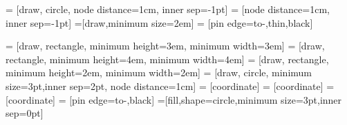  = [draw, circle, node distance=1cm,  inner sep=-1pt] %
 = [node distance=1cm,  inner sep=-1pt] %
=[draw,minimum size=2em]
 = [pin edge={to-,thin,black}]


 = [draw, rectangle, 
    minimum height=3em, minimum width=3em]
  = [draw, rectangle, 
    minimum height=4em, minimum width=4em]
      = [draw, rectangle, 
    minimum height=2em, minimum width=2em]
 = [draw, circle, minimum size=3pt,inner sep=2pt, node distance=1cm]
 = [coordinate]
 = [coordinate]
 = [coordinate]
 = [pin edge={to-,black}]
=[fill,shape=circle,minimum size=3pt,inner sep=0pt]
